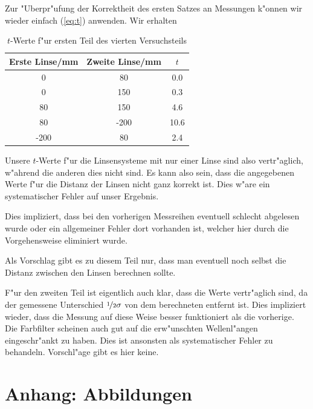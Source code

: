 \documentclass[11pt,a4paper]{article}
\begin{document}
Zur "Uberpr"ufung der Korrektheit des ersten Satzes an Messungen k"onnen wir wieder einfach (\ref{eq:t}) anwenden. Wir erhalten

\begin{table}[h]
\centering
\caption{$t$-Werte f"ur ersten Teil des vierten Versuchsteils} \vspace{11pt}
\begin{tabular}{ccc}
\toprule
\textrm{Erste Linse}/\textrm{mm} & \textrm{Zweite Linse}/\textrm{mm} & $t$ \\
\midrule 
0 & 80 & 0.0 \\
0 & 150 & 0.3 \\
80 & 150 & 4.6 \\
80 & -200 & 10.6 \\
-200 & 80 & 2.4 \\
\bottomrule
\end{tabular}
\label{Tab:X}
\end{table}

Unsere $t$-Werte f"ur die Linsensysteme mit nur einer Linse sind also vertr"aglich, w"ahrend die anderen dies nicht sind. Es kann also sein, dass die angegebenen Werte f"ur die Distanz der Linsen nicht ganz korrekt ist. Dies w"are ein systematischer Fehler auf unser Ergebnis.

Dies impliziert, dass bei den vorherigen Messreihen eventuell schlecht abgelesen wurde oder ein allgemeiner Fehler dort vorhanden ist, welcher hier durch die Vorgehensweise eliminiert wurde.

Als Vorschlag gibt es zu diesem Teil nur, dass man eventuell noch selbst die Distanz zwischen den Linsen berechnen sollte.

F"ur den zweiten Teil ist eigentlich auch klar, dass die Werte vertr"aglich sind, da der gemessene Unterschied $\nicefrac{1}{2}\sigma$ von dem berechneten entfernt ist. Dies impliziert wieder, dass die Messung auf diese Weise besser funktioniert als die vorherige. Die Farbfilter scheinen auch gut auf die erw"unschten Wellenl"angen eingeschr"ankt zu haben. Dies ist ansonsten als systematischer Fehler zu behandeln. Vorschl"age gibt es hier keine.

\section{Anhang: Abbildungen}%



\end{document}
